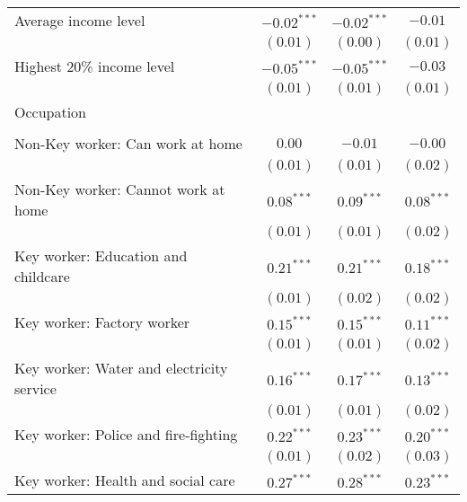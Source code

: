 \begin{table}
\begin{center}
\begin{scriptsize}
\begin{tabular}{l c c c}
\quad Average income level                      & $-0.02^{***}$ & $-0.02^{***}$ & $-0.01$      \\
                                                & $(0.01)$      & $(0.00)$      & $(0.01)$     \\
\quad Highest 20\% income level                 & $-0.05^{***}$ & $-0.05^{***}$ & $-0.03$      \\
                                                & $(0.01)$      & $(0.01)$      & $(0.01)$     \\
Occupation                                      &               &               &              \\
                                                &               &               &              \\
\quad Non-Key worker: Can work at home          & $0.00$        & $-0.01$       & $-0.00$      \\
                                                & $(0.01)$      & $(0.01)$      & $(0.02)$     \\
\quad Non-Key worker: Cannot work at home       & $0.08^{***}$  & $0.09^{***}$  & $0.08^{***}$ \\
                                                & $(0.01)$      & $(0.01)$      & $(0.02)$     \\
\quad Key worker: Education and childcare       & $0.21^{***}$  & $0.21^{***}$  & $0.18^{***}$ \\
                                                & $(0.01)$      & $(0.02)$      & $(0.02)$     \\
\quad Key worker: Factory worker                & $0.15^{***}$  & $0.15^{***}$  & $0.11^{***}$ \\
                                                & $(0.01)$      & $(0.01)$      & $(0.02)$     \\
\quad Key worker: Water and electricity service & $0.16^{***}$  & $0.17^{***}$  & $0.13^{***}$ \\
                                                & $(0.01)$      & $(0.01)$      & $(0.02)$     \\
\quad Key worker: Police and fire-fighting      & $0.22^{***}$  & $0.23^{***}$  & $0.20^{***}$ \\
                                                & $(0.01)$      & $(0.02)$      & $(0.03)$     \\
\quad Key worker: Health and social care        & $0.27^{***}$  & $0.28^{***}$  & $0.23^{***}$ \\

\end{tabular}
\end{scriptsize}
\end{center}
\end{table}
